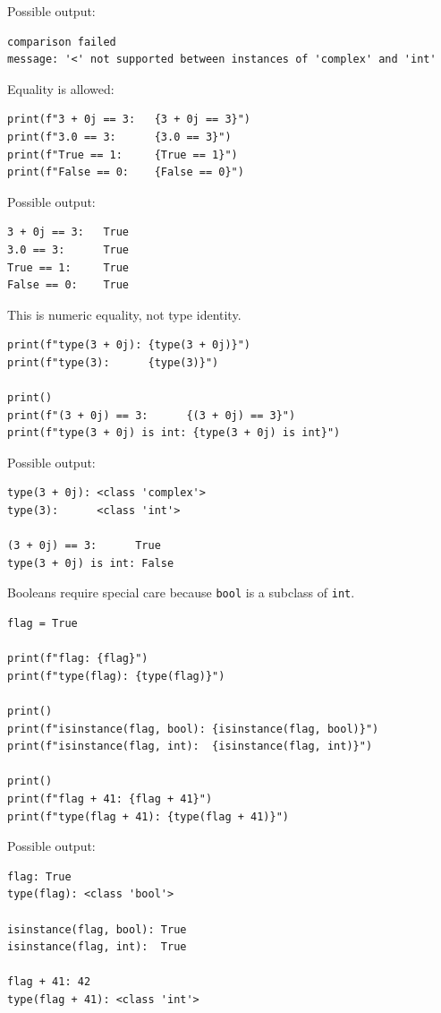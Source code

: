 Possible output:

\begin{verbatim}
comparison failed
message: '<' not supported between instances of 'complex' and 'int'
\end{verbatim}

Equality is allowed:

\begin{verbatim}
print(f"3 + 0j == 3:   {3 + 0j == 3}")
print(f"3.0 == 3:      {3.0 == 3}")
print(f"True == 1:     {True == 1}")
print(f"False == 0:    {False == 0}")
\end{verbatim}

Possible output:

\begin{verbatim}
3 + 0j == 3:   True
3.0 == 3:      True
True == 1:     True
False == 0:    True
\end{verbatim}

This is numeric equality, not type identity.

\begin{verbatim}
print(f"type(3 + 0j): {type(3 + 0j)}")
print(f"type(3):      {type(3)}")

print()
print(f"(3 + 0j) == 3:      {(3 + 0j) == 3}")
print(f"type(3 + 0j) is int: {type(3 + 0j) is int}")
\end{verbatim}

Possible output:

\begin{verbatim}
type(3 + 0j): <class 'complex'>
type(3):      <class 'int'>

(3 + 0j) == 3:      True
type(3 + 0j) is int: False
\end{verbatim}

Booleans require special care because \texttt{bool} is a subclass of \texttt{int}.

\begin{verbatim}
flag = True

print(f"flag: {flag}")
print(f"type(flag): {type(flag)}")

print()
print(f"isinstance(flag, bool): {isinstance(flag, bool)}")
print(f"isinstance(flag, int):  {isinstance(flag, int)}")

print()
print(f"flag + 41: {flag + 41}")
print(f"type(flag + 41): {type(flag + 41)}")
\end{verbatim}

Possible output:

\begin{verbatim}
flag: True
type(flag): <class 'bool'>

isinstance(flag, bool): True
isinstance(flag, int):  True

flag + 41: 42
type(flag + 41): <class 'int'>
\end{verbatim}

